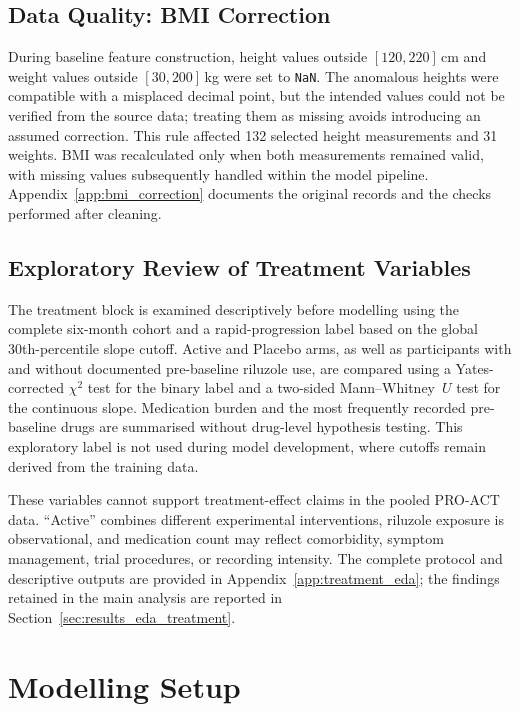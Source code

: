 \subsection{Data Quality: BMI Correction}
\label{sec:methods_bmi_correction}
During baseline feature construction, height values outside $[120,220]$\,cm and weight values outside $[30,200]$\,kg were set to \texttt{NaN}. The anomalous heights were compatible with a misplaced decimal point, but the intended values could not be verified from the source data; treating them as missing avoids introducing an assumed correction. This rule affected 132 selected height measurements and 31 weights. \gls{BMI} was recalculated only when both measurements remained valid, with missing values subsequently handled within the model pipeline. Appendix~\ref{app:bmi_correction} documents the original records and the checks performed after cleaning.

\subsection{Exploratory Review of Treatment Variables}
\label{sec:methods_eda_treatment}
The treatment block is examined descriptively before modelling using the complete six-month cohort and a rapid-progression label based on the global 30th-percentile slope cutoff. Active and Placebo arms, as well as participants with and without documented pre-baseline riluzole use, are compared using a Yates-corrected $\chi^2$ test for the binary label and a two-sided Mann--Whitney~$U$ test for the continuous slope. Medication burden and the most frequently recorded pre-baseline drugs are summarised without drug-level hypothesis testing. This exploratory label is not used during model development, where cutoffs remain derived from the training data.

These variables cannot support treatment-effect claims in the pooled \gls{PRO-ACT} data. ``Active'' combines different experimental interventions, riluzole exposure is observational, and medication count may reflect comorbidity, symptom management, trial procedures, or recording intensity. The complete protocol and descriptive outputs are provided in Appendix~\ref{app:treatment_eda}; the findings retained in the main analysis are reported in Section~\ref{sec:results_eda_treatment}.

\section{Modelling Setup}
\label{sec:methods_modeling}
